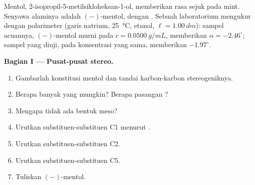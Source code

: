 \begin{problem}
\label{pb:b1:stereochemistry-in-depth:1}
Mentol, 2-isopropil-5-metilsikloheksan-1-ol, memberikan rasa sejuk pada
mint. Senyawa alaminya adalah $(-)$-mentol, dengan 
. Sebuah laboratorium mengukur dengan polarimeter (garis
natrium, \qty{25}{\celsius}, etanol, $\ell = \qty{1.00}{dm}$): sampel
acuannya, $(-)$-mentol murni pada $c = \qty{0.0500}{g/mL}$, memberikan
$\alpha =
-2.46^\circ$; sampel yang diuji, pada konsentrasi yang sama, memberikan
$-1.97^\circ$.

\medskip
\noindent\textbf{Bagian I --- Pusat-pusat stereo.}
\begin{enumerate}
  \item Gambarlah konstitusi mentol dan tandai karbon-karbon
        stereogeniknya.
  \item Berapa banyak  yang mungkin? Berapa pasangan
        ?
  \item Mengapa tidak ada bentuk meso?
  \item Urutkan substituen-substituen C1 menurut .
  \item Urutkan substituen-substituen C2.
  \item Urutkan substituen-substituen C5.
  \item Tuliskan   $(-)$-mentol.
\end{enumerate}


\end{problem}
